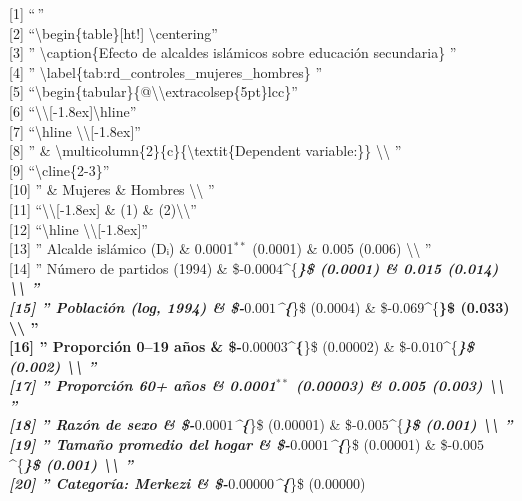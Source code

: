 \documentclass[
]{article}
\begin{document}
{[}1{]} ``\,''\\
{[}2{]} ``\textbackslash begin\{table\}{[}ht!{]}
\textbackslash centering''\\
{[}3{]} '' \textbackslash caption\{Efecto de alcaldes islámicos sobre
educación secundaria\} ''\\
{[}4{]} '' \textbackslash label\{tab:rd\_controles\_mujeres\_hombres\}
''\\
{[}5{]}
``\textbackslash begin\{tabular\}\{@\textbackslash\textbackslash extracolsep\{5pt\}lcc\}''\\
{[}6{]}
``\textbackslash\textbackslash{[}-1.8ex{]}\textbackslash hline''\\
{[}7{]} ``\textbackslash hline
\textbackslash\textbackslash{[}-1.8ex{]}''\\
{[}8{]} '' \&
\textbackslash multicolumn\{2\}\{c\}\{\textbackslash textit\{Dependent
variable:\}\} \textbackslash\textbackslash{} ''\\
{[}9{]} ``\textbackslash cline\{2-3\}''\\
{[}10{]} '' \& Mujeres \& Hombres \textbackslash\textbackslash{} ''\\
{[}11{]} ``\textbackslash\textbackslash{[}-1.8ex{]} \& (1) \&
(2)\textbackslash\textbackslash{}''\\
{[}12{]} ``\textbackslash hline
\textbackslash\textbackslash{[}-1.8ex{]}''\\
{[}13{]} '' Alcalde islámico (Dᵢ) \& 0.0001\(^{**}\) (0.0001) \& 0.005
(0.006) \textbackslash\textbackslash{} ''\\
{[}14{]} '' Número de partidos (1994) \&
\$-\(0.0004\)\^{}\{\textbf{\emph{\}\$ (0.0001) \& 0.015 (0.014)
\textbackslash\textbackslash{} ''\\
{[}15{]} '' Población (log, 1994) \& \$-\(0.001\)\^{}\{}}\}\$ (0.0004)
\& \$-\(0.069\)\^{}\{\textbf{\}\$ (0.033) \textbackslash\textbackslash{}
''\\
{[}16{]} '' Proporción 0--19 años \& \$-\(0.00003\)\^{}\{}\}\$ (0.00002)
\& \$-\(0.010\)\^{}\{\textbf{\emph{\}\$ (0.002)
\textbackslash\textbackslash{} ''\\
{[}17{]} '' Proporción 60+ años \& 0.0001\(^{**}\) (0.00003) \& 0.005
(0.003) \textbackslash\textbackslash{} ''\\
{[}18{]} '' Razón de sexo \& \$-\(0.0001\)\^{}\{}}\}\$ (0.00001) \&
\$-\(0.005\)\^{}\{\textbf{\emph{\}\$ (0.001)
\textbackslash\textbackslash{} ''\\
{[}19{]} '' Tamaño promedio del hogar \& \$-\(0.0001\)\^{}\{}}\}\$
(0.00001) \& \$-\(0.005\)\^{}\{\textbf{\emph{\}\$ (0.001)
\textbackslash\textbackslash{} ''\\
{[}20{]} '' Categoría: Merkezi \& \$-\(0.00000\)\^{}\{}}\}\$ (0.00000)
\end{document}
